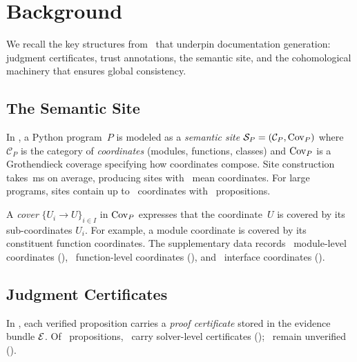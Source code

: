 \documentclass[11pt]{article}
\begin{document}
\section{Background}\label{sec:background}

We recall the key structures from \JuGeo\ that underpin documentation
generation: judgment certificates, trust annotations, the semantic site,
and the cohomological machinery that ensures global consistency.

\subsection{The Semantic Site}
In \JuGeo, a Python program~$P$ is modeled as a \emph{semantic site}
$\mathcal{S}_P = (\mathcal{C}_P, \mathrm{Cov}_P)$ where $\mathcal{C}_P$ is the
category of \emph{coordinates} (modules, functions, classes) and
$\mathrm{Cov}_P$ is a Grothendieck coverage specifying how coordinates compose.
Site construction takes \compSiteMeanBuildMs\,ms on average,
producing sites with \compCoordsMean\ mean coordinates.  For large
programs, sites contain up to \compLargeMeanCoords\ coordinates with
\compLargeMeanProps\ propositions.

A \emph{cover} $\{U_i \to U\}_{i \in I}$ in $\mathrm{Cov}_P$ expresses that
the coordinate~$U$ is covered by its sub-coordinates $U_i$.  For
example, a module coordinate is covered by its constituent function
coordinates.  The supplementary data records \suppCoordModuleCount\
module-level coordinates (\suppCoordModulePct), \suppCoordFunctionCount\
function-level coordinates (\suppCoordFunctionPct), and
\suppCoordInterfaceCount\ interface coordinates (\suppCoordInterfacePct).

\subsection{Judgment Certificates}
In \JuGeo, each verified proposition carries a \emph{proof certificate}
stored in the evidence bundle $\mathcal{E}$.  Of \compTrustTotal\ propositions,
\compTrustSolverdischarged\ carry solver-level certificates
(\compTrustSolverdischargedPct); \compTrustUnverified\ remain unverified
(\compTrustUnverifiedPct).
\end{document}
